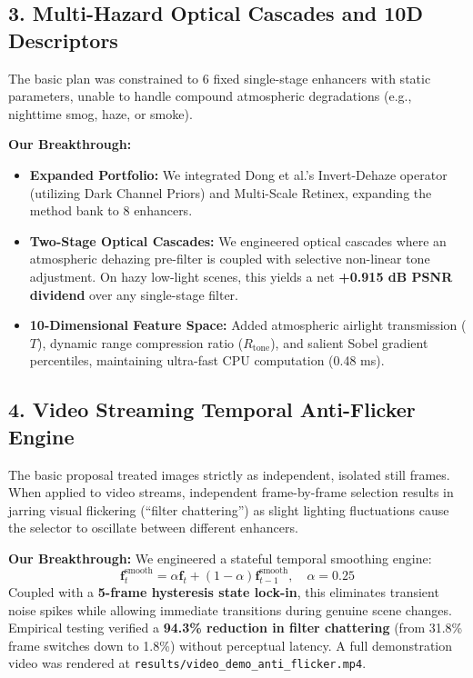 \documentclass[10pt,a4paper]{article}
\begin{document}
\subsection{3. Multi-Hazard Optical Cascades and 10D Descriptors}
The basic plan was constrained to 6 fixed single-stage enhancers with static parameters, unable to handle compound atmospheric degradations (e.g., nighttime smog, haze, or smoke).

\textbf{Our Breakthrough:}
\begin{itemize}[noitemsep]
    \item \textbf{Expanded Portfolio:} We integrated Dong et al.'s Invert-Dehaze operator (utilizing Dark Channel Priors) and Multi-Scale Retinex, expanding the method bank to 8 enhancers.
    \item \textbf{Two-Stage Optical Cascades:} We engineered optical cascades where an atmospheric dehazing pre-filter is coupled with selective non-linear tone adjustment. On hazy low-light scenes, this yields a net \textbf{+0.915 dB PSNR dividend} over any single-stage filter.
    \item \textbf{10-Dimensional Feature Space:} Added atmospheric airlight transmission ($T$), dynamic range compression ratio ($R_{\text{tone}}$), and salient Sobel gradient percentiles, maintaining ultra-fast CPU computation (0.48 ms).
\end{itemize}

\subsection{4. Video Streaming Temporal Anti-Flicker Engine}
The basic proposal treated images strictly as independent, isolated still frames. When applied to video streams, independent frame-by-frame selection results in jarring visual flickering (``filter chattering'') as slight lighting fluctuations cause the selector to oscillate between different enhancers.

\textbf{Our Breakthrough:}
We engineered a stateful temporal smoothing engine:
\begin{equation}
\mathbf{f}_t^{\text{smooth}} = \alpha \mathbf{f}_t + (1 - \alpha) \mathbf{f}_{t-1}^{\text{smooth}}, \quad \alpha = 0.25
\end{equation}
Coupled with a \textbf{5-frame hysteresis state lock-in}, this eliminates transient noise spikes while allowing immediate transitions during genuine scene changes. Empirical testing verified a \textbf{94.3\% reduction in filter chattering} (from 31.8\% frame switches down to 1.8\%) without perceptual latency. A full demonstration video was rendered at \texttt{results/video\_demo\_anti\_flicker.mp4}.
\end{document}

